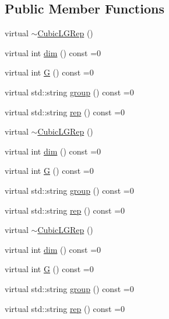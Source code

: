 \subsection*{Public Member Functions}
\begin{DoxyCompactItemize}
\item 
virtual \mbox{\hyperlink{structHadron_1_1CubicLGRep_a7d3ceec69cd0c1c63f11578a5a9a3ad0}{$\sim$\+Cubic\+L\+G\+Rep}} ()
\item 
virtual int \mbox{\hyperlink{structHadron_1_1CubicLGRep_a3acbaea26503ed64f20df693a48e4cdd}{dim}} () const =0
\item 
virtual int \mbox{\hyperlink{structHadron_1_1CubicLGRep_ace26f7b2d55e3a668a14cb9026da5231}{G}} () const =0
\item 
virtual std\+::string \mbox{\hyperlink{structHadron_1_1CubicLGRep_a9bdb14b519a611d21379ed96a3a9eb41}{group}} () const =0
\item 
virtual std\+::string \mbox{\hyperlink{structHadron_1_1CubicLGRep_a50f5ddbb8f4be4cee0106fa9e8c75e6c}{rep}} () const =0
\item 
virtual \mbox{\hyperlink{structHadron_1_1CubicLGRep_a7d3ceec69cd0c1c63f11578a5a9a3ad0}{$\sim$\+Cubic\+L\+G\+Rep}} ()
\item 
virtual int \mbox{\hyperlink{structHadron_1_1CubicLGRep_a3acbaea26503ed64f20df693a48e4cdd}{dim}} () const =0
\item 
virtual int \mbox{\hyperlink{structHadron_1_1CubicLGRep_ace26f7b2d55e3a668a14cb9026da5231}{G}} () const =0
\item 
virtual std\+::string \mbox{\hyperlink{structHadron_1_1CubicLGRep_a9bdb14b519a611d21379ed96a3a9eb41}{group}} () const =0
\item 
virtual std\+::string \mbox{\hyperlink{structHadron_1_1CubicLGRep_a50f5ddbb8f4be4cee0106fa9e8c75e6c}{rep}} () const =0
\item 
virtual \mbox{\hyperlink{structHadron_1_1CubicLGRep_a7d3ceec69cd0c1c63f11578a5a9a3ad0}{$\sim$\+Cubic\+L\+G\+Rep}} ()
\item 
virtual int \mbox{\hyperlink{structHadron_1_1CubicLGRep_a3acbaea26503ed64f20df693a48e4cdd}{dim}} () const =0
\item 
virtual int \mbox{\hyperlink{structHadron_1_1CubicLGRep_ace26f7b2d55e3a668a14cb9026da5231}{G}} () const =0
\item 
virtual std\+::string \mbox{\hyperlink{structHadron_1_1CubicLGRep_a9bdb14b519a611d21379ed96a3a9eb41}{group}} () const =0
\item 
virtual std\+::string \mbox{\hyperlink{structHadron_1_1CubicLGRep_a50f5ddbb8f4be4cee0106fa9e8c75e6c}{rep}} () const =0
\end{DoxyCompactItemize}


